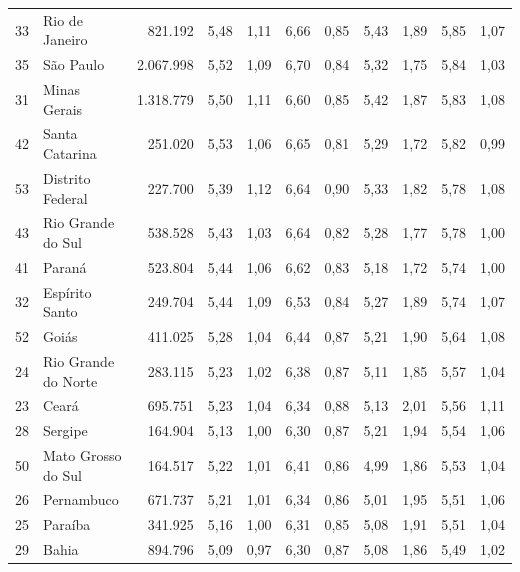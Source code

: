 \begin{table}[]
{\begin{tabular}{llrrrrrrrrr}
            33 & Rio de Janeiro      & 821.192   & 5,48 & 1,11 & 6,66 & 0,85 & 5,43 & 1,89 & 5,85 & 1,07 \\
            \rowcolor[HTML]{DCE6F1}
            35 & São Paulo           & 2.067.998 & 5,52 & 1,09 & 6,70 & 0,84 & 5,32 & 1,75 & 5,84 & 1,03 \\
            31 & Minas Gerais        & 1.318.779 & 5,50 & 1,11 & 6,60 & 0,85 & 5,42 & 1,87 & 5,83 & 1,08 \\
            \rowcolor[HTML]{DCE6F1}
            42 & Santa Catarina      & 251.020   & 5,53 & 1,06 & 6,65 & 0,81 & 5,29 & 1,72 & 5,82 & 0,99 \\
            53 & Distrito Federal    & 227.700   & 5,39 & 1,12 & 6,64 & 0,90 & 5,33 & 1,82 & 5,78 & 1,08 \\
            \rowcolor[HTML]{DCE6F1}
            43 & Rio Grande do Sul   & 538.528   & 5,43 & 1,03 & 6,64 & 0,82 & 5,28 & 1,77 & 5,78 & 1,00 \\
            41 & Paraná              & 523.804   & 5,44 & 1,06 & 6,62 & 0,83 & 5,18 & 1,72 & 5,74 & 1,00 \\
            \rowcolor[HTML]{DCE6F1}
            32 & Espírito Santo      & 249.704   & 5,44 & 1,09 & 6,53 & 0,84 & 5,27 & 1,89 & 5,74 & 1,07 \\
            52 & Goiás               & 411.025   & 5,28 & 1,04 & 6,44 & 0,87 & 5,21 & 1,90 & 5,64 & 1,08 \\
            \rowcolor[HTML]{DCE6F1}
            24 & Rio Grande do Norte & 283.115   & 5,23 & 1,02 & 6,38 & 0,87 & 5,11 & 1,85 & 5,57 & 1,04 \\
            23 & Ceará               & 695.751   & 5,23 & 1,04 & 6,34 & 0,88 & 5,13 & 2,01 & 5,56 & 1,11 \\
            \rowcolor[HTML]{DCE6F1}
            28 & Sergipe             & 164.904   & 5,13 & 1,00 & 6,30 & 0,87 & 5,21 & 1,94 & 5,54 & 1,06 \\
            50 & Mato Grosso do Sul  & 164.517   & 5,22 & 1,01 & 6,41 & 0,86 & 4,99 & 1,86 & 5,53 & 1,04 \\
            \rowcolor[HTML]{DCE6F1}
            26 & Pernambuco          & 671.737   & 5,21 & 1,01 & 6,34 & 0,86 & 5,01 & 1,95 & 5,51 & 1,06 \\
            25 & Paraíba             & 341.925   & 5,16 & 1,00 & 6,31 & 0,85 & 5,08 & 1,91 & 5,51 & 1,04 \\
            \rowcolor[HTML]{DCE6F1}
            29 & Bahia               & 894.796   & 5,09 & 0,97 & 6,30 & 0,87 & 5,08 & 1,86 & 5,49 & 1,02 \\

\end{tabular}}
\end{table}
